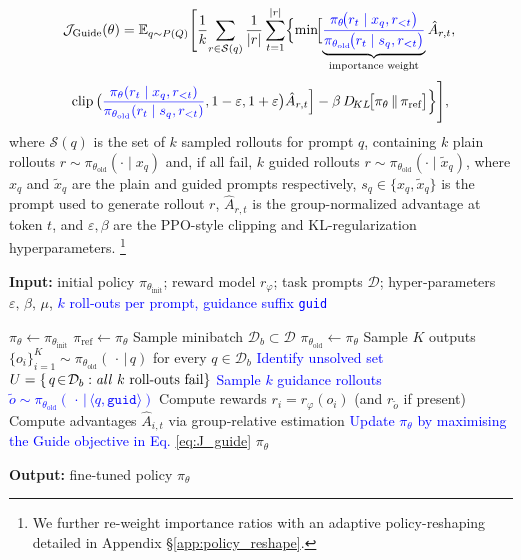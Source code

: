 \documentclass{article}
\begin{document}
\begin{equation}
\label{eq:J_guide}
\mathcal{J}_{\text{Guide}}(\theta)=
\mathbb{E}_{q \sim P(Q)}
\Biggl[
\frac{1}{k}\!
\sum_{r \in \mathcal{S}(q)}
\frac{1}{|r|}\sum_{t=1}^{|r|}
\Bigl\{
\min\!\Bigl[
\underbrace{
\textcolor{blue}{
\frac{\pi_\theta\!\bigl(r_t \mid x_q, r_{<t}\bigr)}
     {\pi_{\theta_{\text{old}}}\!\bigl(r_t \mid s_q, r_{<t}\bigr)}
}}_{\text{importance weight}}
\hat A_{r,t},
\;
\end{equation}
\[
\text{clip }\!\bigl(
\textcolor{blue}{
\frac{\pi_\theta(r_t \mid x_q, r_{<t})}
     {\pi_{\theta_{\text{old}}}(r_t \mid s_q, r_{<t})}
},
1-\varepsilon,1+\varepsilon
\bigr)\hat A_{r,t}
\Bigr] 
- \beta\,D_{\!KL}\!\bigl[\pi_\theta \,\|\, \pi_{\text{ref}}\bigr]
\Bigr\}
\Biggr],
\] 
\noindent where \(\mathcal{S}(q)\) is the set of \(k\) sampled rollouts for prompt \(q\), containing \(k\) plain rollouts \(r \sim \pi_{\theta_{\text{old}}}(\cdot \mid x_q)\) and, if all fail, \(k\) guided rollouts \(r \sim \pi_{\theta_{\text{old}}}(\cdot \mid \tilde x_q)\), where \(x_q\) and \(\tilde x_q\) are the plain and guided prompts respectively, \(s_q \in \{x_q, \tilde x_q\}\) is the prompt used to generate rollout \(r\), \(\hat A_{r,t}\) is the group-normalized advantage at token \(t\), and \(\varepsilon, \beta\) are the PPO-style clipping and KL-regularization hyperparameters. \footnote{We further re-weight importance ratios with an adaptive policy-reshaping detailed in Appendix \S\ref{app:policy_reshape}.}
\begin{algorithm}[H]
\caption{\textbf{Guide-GRPO}: Group Relative Policy Optimization with guidance-augmented rollouts on failure}
\label{alg:ggrpo}
\small
\textbf{Input:} initial policy $\pi_{\theta_\text{init}}$; reward model $r_\varphi$;  
task prompts $\mathcal D$; hyper‑parameters $\varepsilon,\,\beta,\,\mu$,  
\textcolor{blue}{$k$ roll‑outs per prompt, guidance suffix \texttt{guid}}
\begin{algorithmic}[1]
\State $\pi_\theta \gets \pi_{\theta_\text{init}}$
    \State $\pi_{\text{ref}} \gets \pi_\theta$      
        \State Sample minibatch $\mathcal D_b \subset \mathcal D$
        \State $\pi_{\theta_\text{old}} \gets \pi_\theta$ 
        \State Sample $K$ outputs $\{o_i\}_{i=1}^{K}
               \sim\pi_{\theta_\text{old}}(\,\cdot\,|\,q)$ for every $q\in\mathcal D_b$
        \State \textcolor{blue}{Identify unsolved set
              $U=\{\,q\!\in\!\mathcal D_b :
              \text{\emph{all} $k$ roll‑outs fail}\}$}
            \State \textcolor{blue}{Sample $k$ guidance rollouts $\tilde o \sim \pi_{\theta_\text{old}}(\,\cdot\,|\,\langle q, \texttt{guid} \rangle)$}
        \EndFor
        \State Compute rewards $r_i = r_\varphi(o_i)$ (and $r_{\tilde o}$ if present)
        \State Compute advantages $\hat A_{i,t}$ via group‑relative estimation
            \State \textcolor{blue}{Update $\pi_\theta$ by maximising the Guide objective in Eq. \ref{eq:J_guide}}
        \EndFor
    \EndFor
\EndFor
\State \Return $\pi_\theta$
\end{algorithmic}
\textbf{Output:} fine‑tuned policy $\pi_\theta$
\end{algorithm}
\end{document}
